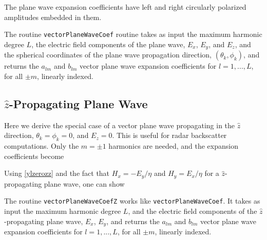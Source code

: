 The plane wave expansion coefficients have left and right circularly polarized amplitudes embedded in them.  

The routine \texttt{vectorPlaneWaveCoef} routine takes as input the maximum harmonic degree $L$, the electric field components of the plane wave, $E_x$, $E_y$, and $E_z$, and the spherical coordinates of the plane wave propagation direction, $(\theta_k, \phi_k)$, and returns the $a_{lm}$ and $b_{lm}$ vector plane wave expansion coefficients for $l = 1,...,L$, for all $\pm m$, linearly indexed. 

{\footnotesize
{}
}







\subsection{$\hat{z}$-Propagating Plane Wave}

Here we derive the special case of a vector plane wave propagating in the $\hat{z}$ direction, $\theta_k = \phi_k = 0$, and $E_z = 0$.  This is useful for radar backscatter computations. Only the $m=\pm 1$ harmonics are needed, and the expansion coefficients become


Using \eqref{ylzerozz} and the fact that $H_x = -E_y/\eta$ and $H_y = E_x/\eta$ for a $\hat{z}$-propagating plane wave, one can show


The routine \texttt{vectorPlaneWaveCoefZ} works like \texttt{vectorPlaneWaveCoef}. It takes as input the maximum harmonic degree $L$, and the electric field components of the $\hat{z}$-propagating plane wave, $E_x$, $E_y$, and returns the $a_{lm}$ and $b_{lm}$ vector plane wave expansion coefficients for $l = 1,...,L$, for all $\pm m$, linearly indexed.


